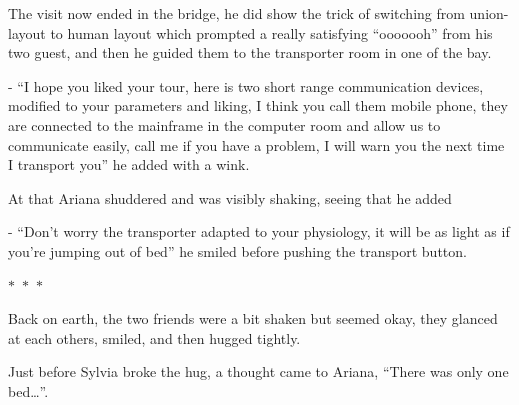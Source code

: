 \documentclass[hidelinks,12pt,a4paper]{book}
\newcommand\sep{\begin{center}
  \boldmath $\ast$~$\ast$~$\ast$
\end{center}}
\begin{document}
The visit now ended in the bridge, he did show the trick of switching from union-layout to human layout which prompted 
a really satisfying “ooooooh” from his two guest, and then he guided them to the transporter room in one of the bay.\par
\bigskip

- “I hope you liked your tour, here is two short range communication devices, modified to your parameters and 
liking, I think you call them mobile phone, they are connected to the mainframe in the computer room and allow us 
to communicate easily, call me if you have a problem, I will warn you the next time I transport you” he added with a wink.\par
\bigskip

At that Ariana shuddered and was visibly shaking, seeing that he added\par
\bigskip

- “Don't worry the transporter adapted to your physiology, it will be as light as if you're jumping out of bed” 
he smiled before pushing the transport button.

\sep

Back on earth, the two friends were a bit shaken but seemed okay, they glanced at each others, smiled, and then 
hugged tightly.\par
\bigskip

Just before Sylvia broke the hug, a thought came to Ariana, “There was only one bed…”.
\printglossaries
\end{document}
